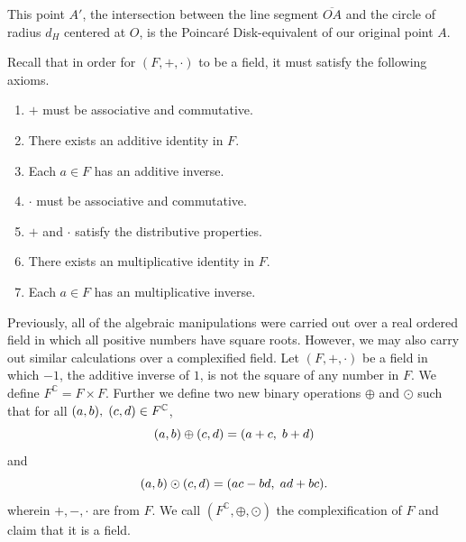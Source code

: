 \documentclass[12pt]{article}
\newcommand{\C}{\mathbb{C}}
\newcommand{\poincare}{Poincar\'{e} }
\newcommand{\ttc}{, \hspace{1mm}}
\theoremstyle{plain}
\theoremstyle{definition}
\begin{document}
This point $A'$, the intersection between the line segment $\overline{OA}$ and the circle of radius $d_H$ centered at $O$, is the \poincare Disk-equivalent of our original point $A$.





\newpage 
{}

\noindent Recall that in order for $(F,+,\cdot)$ to be a field, it must satisfy the following axioms.
\begin{enumerate}
	\item $+$ must be associative and commutative.
	\item There exists an additive identity in $F$.
	\item Each $a\in F$ has an additive inverse.
	\item $\cdot$ must be associative and commutative.
	\item $+$ and $\cdot$ satisfy the distributive properties.
	\item There exists an multiplicative identity in $F$.
	\item Each $a\in F$ has an multiplicative inverse.
\end{enumerate}
Previously, all of the algebraic manipulations were carried out over a real ordered field in which all positive numbers have square roots. However, we may also carry out similar calculations over a complexified field. Let $(F,+,\cdot)$ be a field in which $-1$, the additive inverse of $1$, is not the square of any number in $F$. We define $F^\C = F\times F$. Further we define two new binary operations $\oplus$ and $\odot$ such that for all $(a,b)\ttc (c,d)\in F^\C$,
	\[
		(a,b)\oplus(c,d) = (a + c\ttc b + d)
	\]
and
	\[
		(a,b)\odot(c,d) = (ac - bd\ttc ad + bc).
	\]
wherein $+,-,\cdot$ are from $F$. We call $(F^\C,\oplus,\odot)$ the complexification of $F$ and claim that it is a field. 
\end{document}
